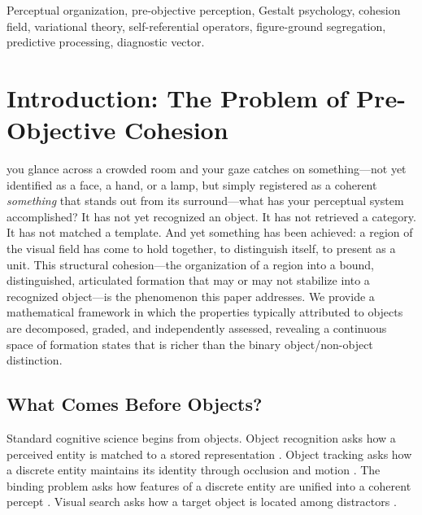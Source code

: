 \documentclass[lettersize,journal]{IEEEtran}
\begin{document}
\begin{abstract}
dynamics via mountain pass theorem, and structured spectral bounds, verified computationally on grids up to $50 \times 50$ ($n = 2{,}500$).
\end{abstract}

\begin{IEEEkeywords}
Perceptual organization, pre-objective perception, Gestalt psychology, cohesion field, variational theory, self-referential operators, figure-ground segregation, predictive processing, diagnostic vector.
\end{IEEEkeywords}

\section{Introduction: The Problem of Pre-Objective Cohesion}

 you glance across a crowded room and your gaze catches on something---not yet identified as a face, a hand, or a lamp, but simply registered as a coherent \emph{something} that stands out from its surround---what has your perceptual system accomplished? It has not yet recognized an object. It has not retrieved a category. It has not matched a template. And yet something has been achieved: a region of the visual field has come to hold together, to distinguish itself, to present as a unit. This structural cohesion---the organization of a region into a bound, distinguished, articulated formation that may or may not stabilize into a recognized object---is the phenomenon this paper addresses. We provide a mathematical framework in which the properties typically attributed to objects are decomposed, graded, and independently assessed, revealing a continuous space of formation states that is richer than the binary object/non-object distinction.

\subsection{What Comes Before Objects?}

Standard cognitive science begins from objects. Object recognition asks how a perceived entity is matched to a stored representation \cite{biederman1987recognition}. Object tracking asks how a discrete entity maintains its identity through occlusion and motion \cite{pylyshyn1988tracking}. The binding problem asks how features of a discrete entity are unified into a coherent percept \cite{treisman1996binding}. Visual search asks how a target object is located among distractors \cite{wolfe1994guided}.
\end{document}
